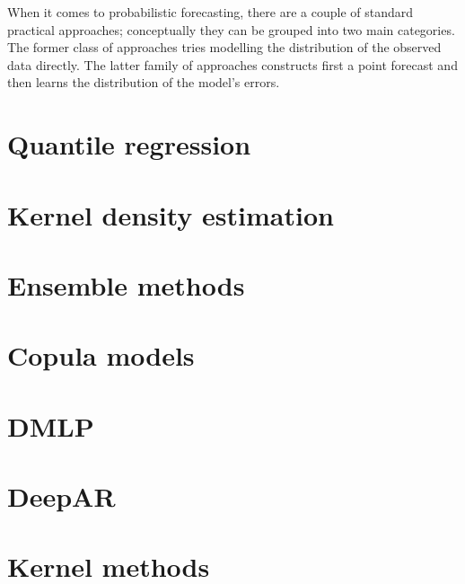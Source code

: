 When it comes to probabilistic forecasting, there are a couple of standard practical approaches; conceptually they can be grouped into two main categories. The former class of approaches tries modelling the distribution of the observed data directly. The latter family of approaches constructs first a point forecast and then learns the distribution of the model's errors.
\section{Quantile regression}


\section{Kernel density estimation}


\section{Ensemble methods}


\section{Copula models}

\section{DMLP}

\section{DeepAR}

\section{Kernel methods}
